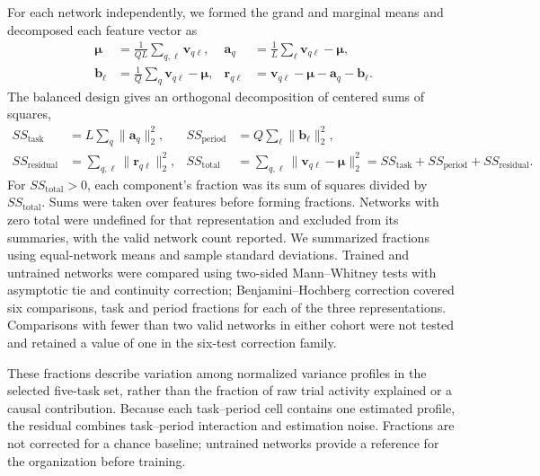 \documentclass{article}
\begin{document}
For each network independently, we formed the grand and marginal means
and decomposed each feature vector as
\begin{align}
    \boldsymbol\mu &= \frac{1}{QL}\sum_{q,\ell}\mathbf{v}_{q\ell}, &
    \mathbf{a}_{q} &= \frac{1}{L}\sum_{\ell}\mathbf{v}_{q\ell}-\boldsymbol\mu, \\
    \mathbf{b}_{\ell} &= \frac{1}{Q}\sum_q\mathbf{v}_{q\ell}-\boldsymbol\mu, &
    \mathbf{r}_{q\ell} &= \mathbf{v}_{q\ell}-\boldsymbol\mu
                          -\mathbf{a}_q-\mathbf{b}_{\ell}.
\end{align}
The balanced design gives an orthogonal decomposition of centered sums of
squares,
\begin{align}
    SS_{\mathrm{task}} &= L\sum_q\|\mathbf{a}_q\|_2^2, &
    SS_{\mathrm{period}} &= Q\sum_{\ell}\|\mathbf{b}_{\ell}\|_2^2, \\
    SS_{\mathrm{residual}} &= \sum_{q,\ell}\|\mathbf{r}_{q\ell}\|_2^2, &
    SS_{\mathrm{total}} &= \sum_{q,\ell}\|\mathbf{v}_{q\ell}-\boldsymbol\mu\|_2^2
       = SS_{\mathrm{task}}+SS_{\mathrm{period}}+SS_{\mathrm{residual}}.
    \label{eq:task-period-variance-partition}
\end{align}
For $SS_{\mathrm{total}}>0$, each component's fraction was its sum of
squares divided by $SS_{\mathrm{total}}$. Sums were taken over features
before forming fractions. Networks with zero total were undefined for
that representation and excluded from its summaries, with the valid
network count reported. We summarized fractions using equal-network means
and sample standard deviations. Trained and untrained networks were
compared using two-sided Mann--Whitney tests with asymptotic tie and
continuity correction; Benjamini--Hochberg correction covered six
comparisons, task and period fractions for each of the three representations.
Comparisons with fewer than two valid networks in either cohort were not
tested and retained a value of one in the six-test correction family.

These fractions describe variation among normalized variance profiles in
the selected five-task set, rather than the fraction of raw trial activity
explained or a causal contribution. Because each task--period cell contains
one estimated profile, the residual combines task--period interaction and
estimation noise. Fractions are not corrected for a chance baseline;
untrained networks provide a reference for the organization before training.
\end{document}
